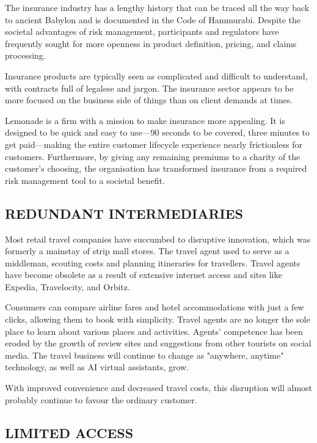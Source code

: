\documentclass{article}
\begin{document}
The insurance industry has a lengthy history that can be traced all the way back to ancient Babylon and is documented in the Code of Hammurabi. Despite the societal advantages of risk management, participants and regulators have frequently sought for more openness in product definition, pricing, and claims processing.


Insurance products are typically seen as complicated and difficult to understand, with contracts full of legalese and jargon. The insurance sector appears to be more focused on the business side of things than on client demands at times.


Lemonade is a firm with a mission to make insurance more appealing. It is designed to be quick and easy to use––90 seconds to be covered, three minutes to get paid––making the entire customer lifecycle experience nearly frictionless for customers. Furthermore, by giving any remaining premiums to a charity of the customer's choosing, the organisation has transformed insurance from a required risk management tool to a societal benefit.

\subsection{REDUNDANT INTERMEDIARIES}

Most retail travel companies have succumbed to disruptive innovation, which was formerly a mainstay of strip mall stores. The travel agent used to serve as a middleman, scouting costs and planning itineraries for travellers. Travel agents have become obsolete as a result of extensive internet access and sites like Expedia, Travelocity, and Orbitz.


Consumers can compare airline fares and hotel accommodations with just a few clicks, allowing them to book with simplicity. Travel agents are no longer the sole place to learn about various places and activities. Agents' competence has been eroded by the growth of review sites and suggestions from other tourists on social media. The travel business will continue to change as "anywhere, anytime" technology, as well as AI virtual assistants, grow.


With improved convenience and decreased travel costs, this disruption will almost probably continue to favour the ordinary customer.

\subsection{LIMITED ACCESS}
\end{document}
